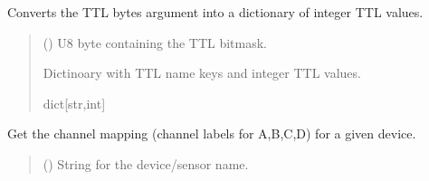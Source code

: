 \documentclass[letterpaper,10pt,english]{sphinxmanual}
\begin{document}
\begin{fulllineitems}
\begin{fulllineitems}
\begin{quote}
\begin{description}
\end{description}\end{quote}

\end{fulllineitems}


\begin{fulllineitems}
\label{\detokenize{PodDevice_8401HR:PodDevice_8401HR.POD_8401HR.DecodeTTLByte}}
\pysigstartsignatures
{}
\pysigstopsignatures
\sphinxAtStartPar
Converts the TTL bytes argument into a dictionary of integer TTL values.
\begin{quote}\begin{description}
\sphinxAtStartPar
{} () \textendash{} U8 byte containing the TTL bitmask.

\sphinxAtStartPar
Dictinoary with TTL name keys and integer TTL values.

\sphinxAtStartPar
dict{[}str,int{]}

\end{description}\end{quote}

\end{fulllineitems}


\begin{fulllineitems}
\label{\detokenize{PodDevice_8401HR:PodDevice_8401HR.POD_8401HR.GetChannelMapForPreampDevice}}
\pysigstartsignatures
{}
\pysigstopsignatures
\sphinxAtStartPar
Get the channel mapping (channel labels for A,B,C,D) for a given device.
\begin{quote}\begin{description}
\sphinxAtStartPar
{} () \textendash{} String for the device/sensor name.


\end{description}
\end{quote}
\end{fulllineitems}
\end{fulllineitems}
\end{document}
